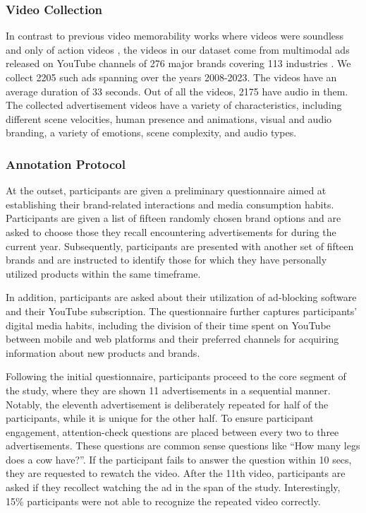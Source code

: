 \subsubsection{Video Collection}
\label{sec:Video Collection}
In contrast to previous video memorability works where videos were soundless and only of action videos \cite{newman2020multimodal, cohendet2019videomem}, the videos in our dataset come from multimodal ads released on YouTube channels of 276 major brands covering 113 industries%
. We collect 2205 such ads spanning over the years 2008-2023. The videos have an average duration of 33 seconds. Out of all the videos, 2175 have audio in them. The collected advertisement videos have a variety of characteristics, including different scene velocities, human presence and animations, visual and audio branding, a variety of emotions, scene complexity, and audio types. 




\subsubsection{Annotation Protocol}
\label{sec:Annotation Protocol}
At the outset, participants are given a preliminary questionnaire aimed at establishing their brand-related interactions and media consumption habits. Participants are given a list of fifteen randomly chosen brand options and are asked to choose those they recall encountering advertisements for during the current year. Subsequently, participants are presented with another set of fifteen brands and are instructed to identify those for which they have personally utilized products within the same timeframe. 

In addition, participants are asked about their utilization of ad-blocking software and their YouTube subscription. The questionnaire further captures participants' digital media habits, including the division of their time spent on YouTube between mobile and web platforms and their preferred channels for acquiring information about new products and brands.

Following the initial questionnaire, participants proceed to the core segment of the study, where they are shown 11 advertisements in a sequential manner. Notably, the eleventh advertisement is deliberately repeated for half of the participants, while it is unique for the other half. To ensure participant engagement, attention-check questions are placed between every two to three advertisements. These questions are common sense questions like ``How many legs does a cow have?''. If the participant fails to answer the question within 10 secs, they are requested to rewatch the video. After the 11th video, participants are asked if they recollect watching the ad in the span of the study. Interestingly, 15\% participants were not able to recognize the repeated video correctly. 



